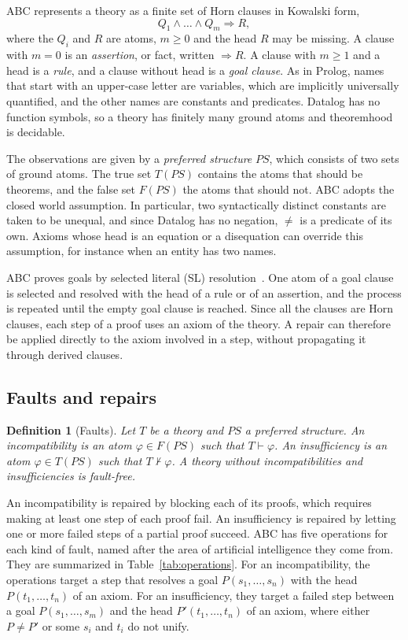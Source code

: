 \documentclass[preprint,12pt]{elsarticle}
\newtheorem{definition}{Definition}
\newcommand{\TPS}{T(\mathit{PS})}
\newcommand{\FPS}{F(\mathit{PS})}
\newcommand{\imp}{\Longrightarrow}
\begin{document}
ABC represents a theory as a finite set of Horn clauses in Kowalski form,
\[
  Q_1 \wedge \dots \wedge Q_m \imp R,
\]
where the $Q_i$ and $R$ are atoms, $m \geq 0$ and the head $R$ may be
missing. A clause with $m = 0$ is an \emph{assertion}, or fact, written
$\imp R$. A clause with $m \geq 1$ and a head is a \emph{rule}, and a clause
without head is a \emph{goal clause}. As in Prolog, names that start with an
upper-case letter are variables, which are implicitly universally
quantified, and the other names are constants and predicates. Datalog has
no function symbols, so a theory has finitely many ground atoms and
theoremhood is decidable.

The observations are given by a \emph{preferred structure} $\mathit{PS}$,
which consists of two sets of ground atoms. The true set $\TPS$ contains
the atoms that should be theorems, and the false set $\FPS$ the atoms that
should not. ABC adopts the closed world assumption. In particular, two
syntactically distinct constants are taken to be unequal, and since
Datalog has no negation, $\neq$ is a predicate of its own. Axioms whose
head is an equation or a disequation can override this assumption, for
instance when an entity has two names.

ABC proves goals by selected literal (SL) resolution~\cite{KowalskiKuehner71}.
One atom of a goal clause is selected and resolved with the head of a rule
or of an assertion, and the process is repeated until the empty goal
clause is reached. Since all the clauses are Horn clauses, each step of a
proof uses an axiom of the theory. A repair can therefore be applied
directly to the axiom involved in a step, without propagating it through
derived clauses.

\subsection{Faults and repairs}

\begin{definition}[Faults]
Let $T$ be a theory and $\mathit{PS}$ a preferred structure. An
\emph{incompatibility} is an atom $\varphi \in \FPS$ such that
$T \vdash \varphi$. An \emph{insufficiency} is an atom $\varphi \in \TPS$
such that $T \nvdash \varphi$. A theory without incompatibilities and
insufficiencies is \emph{fault-free}.
\end{definition}

An incompatibility is repaired by blocking each of its proofs, which
requires making at least one step of each proof fail. An insufficiency is
repaired by letting one or more failed steps of a partial proof succeed.
ABC has five operations for each kind of fault, named after the area of artificial intelligence they come
from. They are summarized in Table~\ref{tab:operations}. For an
incompatibility, the operations target a step that resolves a goal
$P(s_1,\dots,s_n)$ with the head $P(t_1,\dots,t_n)$ of an axiom. For an
insufficiency, they target a failed step between a goal
$P(s_1,\dots,s_m)$ and the head $P'(t_1,\dots,t_n)$ of an axiom, where
either $P \neq P'$ or some $s_i$ and $t_i$ do not unify.
\end{document}
